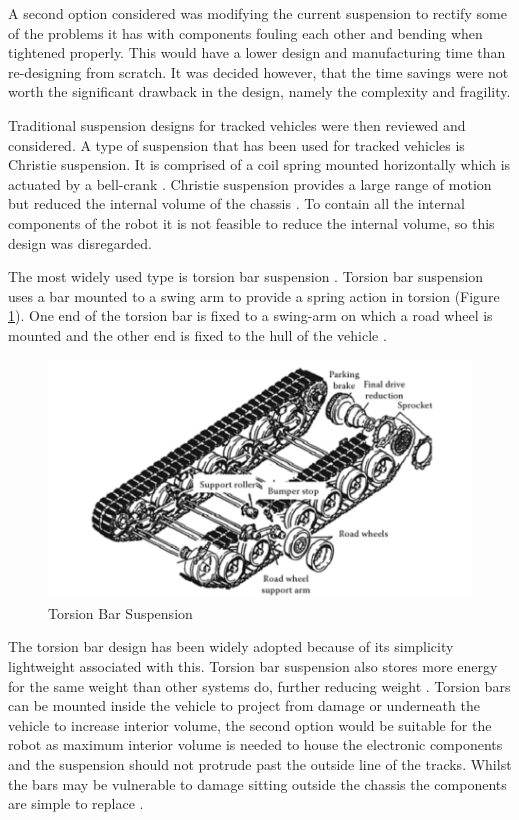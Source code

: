 A second option considered was modifying the current suspension to rectify some of the problems it has with components fouling each other and bending when tightened properly. This would have a lower design and manufacturing time than re-designing from scratch. It was decided however, that the time savings were not worth the significant drawback in the design, namely the complexity and fragility.\par

Traditional suspension designs for tracked vehicles were then reviewed and considered. A type of suspension that has been used for tracked vehicles is Christie suspension. It is comprised of a coil spring mounted horizontally which is actuated by a bell-crank \cite{Mastinu11}. Christie suspension provides a large range of motion but reduced the internal volume of the chassis \cite{Zaloga15}. To contain all the internal components of the robot it is not feasible to reduce the internal volume, so this design was disregarded. 
\par

The most widely used type is torsion bar suspension \cite{Mastinu11}. Torsion bar suspension uses a bar mounted to a swing arm to provide a spring action in torsion (Figure \ref{fig:torsionbar}). One end of the torsion bar is fixed to a swing-arm on which a road wheel is mounted and the other end is fixed to the hull of the vehicle \cite{Mastinu11}. \par
\begin{figure}[h]
\centering\includegraphics[width=0.6\linewidth]{Images/MaxImages/torsionbarsus.png}
\caption{Torsion Bar Suspension \cite{Mastinu11}}
\label{fig:torsionbar}
\end{figure}
The torsion bar design has been widely adopted because of its simplicity lightweight associated with this. Torsion bar suspension also stores more energy for the same weight than other systems do, further reducing weight \citet{Hohl85}. Torsion bars can be mounted inside the vehicle to project from damage or underneath the vehicle to increase interior volume, the second option would be suitable for the robot as maximum interior volume is needed to house the electronic components and the suspension should not protrude past the outside line of the tracks. Whilst the bars may be vulnerable to damage sitting outside the chassis the components are simple to replace \cite{Hohl85}. 


